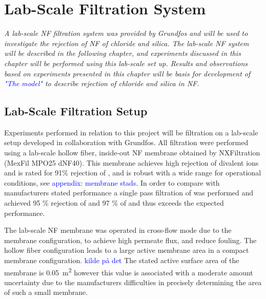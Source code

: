 \chapter{Lab-Scale Filtration System}


\textit{%
A lab-scale NF filtration system was provided by Grundfos and will be used to investigate the rejection of NF of chloride and silica. 
The lab-scale NF system will be described in the following chapter, and experiments discussed in this chapter will be performed using this lab-scale set up. 
Results and observations based on experiments presented in this chapter will be basis for development of \textcolor{blue}{"The model"} to describe rejection of chloride and silica in NF.
}


\section{Lab-Scale Filtration Setup}

Experiments performed in relation to this project will be  filtration on a lab-scale setup developed in collaboration with Grundfos. 
All filtration were performed using a lab-scale hollow fiber, inside-out NF membrane obtained by NXFiltration (MexFil MPO25 dNF40). 
This membrane achieves high rejection of divalent ions and is rated for 91\% rejection of , and is robust with a wide range for operational conditions, see \textcolor{blue}{appendix: membrane stads}. 
In order to compare with manufacturers stated performance a single pass filtration of  was performed and achieved 95 \% rejection of  and 97 \% of  and thus exceeds the expected performance.

The lab-scale NF membrane was operated in cross-flow mode due to the membrane configuration, to achieve high permeate flux, and reduce fouling. 
The hollow fiber configuration leads to a large active membrane area in a compact membrane configuration. \textcolor{blue}{kilde på det}
The stated active surface area of the membrane is \SI{0.05}{\square\meter} 
however this value is associated with a moderate amount uncertainty due to the manufacturers difficulties in precisely determining the area of such a small membrane.  \citep{Datasheet_dNF40_labscale_2019}



